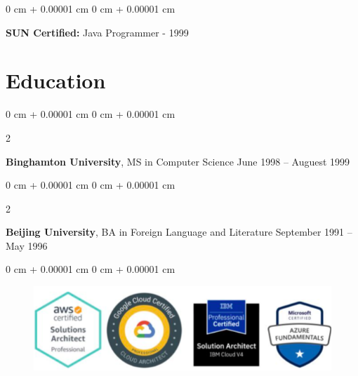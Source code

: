 \documentclass[10pt, letterpaper]{article}
\newenvironment{onecolentry}{
    \begin{adjustwidth}{
        0 cm + 0.00001 cm
    }{
        0 cm + 0.00001 cm
    }
}{
    \end{adjustwidth}
} %
\newenvironment{twocolentry}[2][]{
    \onecolentry
    \def\secondColumn{#2}
    \setcolumnwidth{\fill, 4.5 cm}
    \begin{paracol}{2}
}{
    \switchcolumn \raggedleft \secondColumn
    \end{paracol}
    \endonecolentry
} %
\begin{document}
        \begin{onecolentry}
            \textbf{SUN Certified:} Java Programmer - 1999
        \end{onecolentry}        



        \section{Education}

        \begin{twocolentry}{
            June 1998 – Auguest 1999
        }
            \textbf{Binghamton University}, MS in Computer Science\end{twocolentry}
        \begin{twocolentry}{
                September 1991 – May 1996
            }
                \textbf{Beijing University}, BA in Foreign Language and Literature\end{twocolentry}           
        \vspace{0.10 cm}
        
        \begin{onecolentry}
            \begin{figure}
                \centering
                \includegraphics[width=0.6\linewidth]{mc.png}
            \end{figure}
        \end{onecolentry}
    
\end{document}
